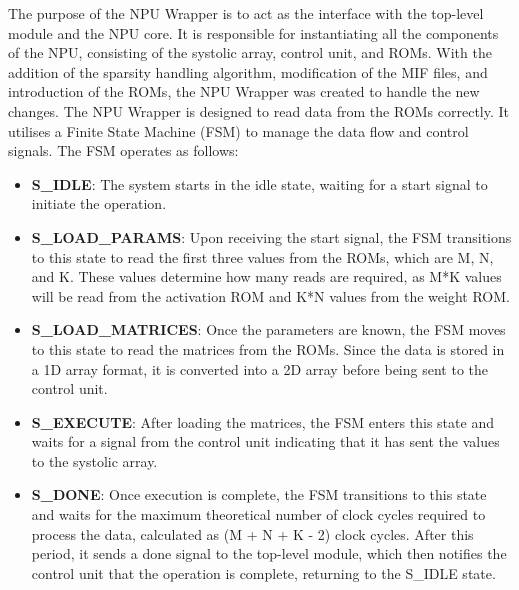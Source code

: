 \documentclass[12pt, a4paper, ukenglish]{article}
\begin{document}
{        The purpose of the NPU Wrapper is to act as the interface with the top-level module and the NPU core. It is responsible for instantiating all the components of the NPU, consisting of the systolic array, control unit, and ROMs. With the addition of the sparsity handling algorithm, modification of the MIF files, and introduction of the ROMs, the NPU Wrapper was created to handle the new changes. 
        The NPU Wrapper is designed to read data from the ROMs correctly. It utilises a Finite State Machine (FSM) to manage the data flow and control signals. The FSM operates as follows:
        \begin{itemize}
            \item \textbf{S\_IDLE}: The system starts in the idle state, waiting for a start signal to initiate the operation.
            \item \textbf{S\_LOAD\_PARAMS}: Upon receiving the start signal, the FSM transitions to this state to read the first three values from the ROMs, which are M, N, and K. These values determine how many reads are required, as M*K values will be read from the activation ROM and K*N values from the weight ROM.
            \item \textbf{S\_LOAD\_MATRICES}: Once the parameters are known, the FSM moves to this state to read the matrices from the ROMs. Since the data is stored in a 1D array format, it is converted into a 2D array before being sent to the control unit.
            \item \textbf{S\_EXECUTE}: After loading the matrices, the FSM enters this state and waits for a signal from the control unit indicating that it has sent the values to the systolic array.
            \item \textbf{S\_DONE}: Once execution is complete, the FSM transitions to this state and waits for the maximum theoretical number of clock cycles required to process the data, calculated as (M + N + K - 2) clock cycles. After this period, it sends a done signal to the top-level module, which then notifies the control unit that the operation is complete, returning to the S\_IDLE state.
        \end{itemize}




    }
    
\end{document}
